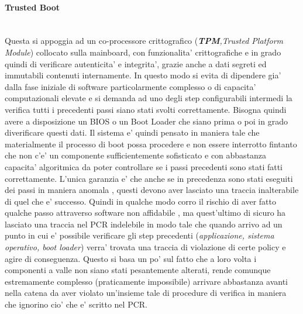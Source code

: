 \paragraph{Trusted Boot}\\
Questa si appoggia ad un co-processore crittografico (\emph{\textbf{TPM},Trusted Platform Module}) collocato sulla mainboard, con funzionalita' crittografiche e in grado quindi di verificare autenticita' e integrita', grazie anche a dati segreti ed immutabili contenuti internamente. In questo modo si evita di dipendere gia' dalla fase iniziale di software particolarmente complesso o di capacita' computazionali elevate e si demanda ad uno degli step configurabili intermedi la verifica tutti i precedenti passi siano stati svolti correttamente. Bisogna quindi avere a disposizione un BIOS o un Boot Loader che siano prima o poi in grado diverificare questi dati. Il sistema e' quindi pensato in maniera tale che materialmente il processo di boot possa procedere e non essere interrotto fintanto che non c'e' un componente sufficientemente sofisticato e con abbastanza capacita' algoritmica da poter controllare se i passi precedenti sono stati fatti correttamente. L'unica garanzia e' che anche se in precedenza sono stati eseguiti dei passi in maniera anomala , questi devono aver lasciato una traccia inalterabile di quel che e' successo. Quindi in qualche modo corro il rischio di aver fatto qualche passo attraverso software non affidabile , ma quest'ultimo di sicuro ha lasciato una traccia nel PCR indelebile in modo tale che quando arrivo ad un punto in cui e' possibile verificare gli step precedenti (\emph{applicazione, sistema operativo, boot loader}) verra' trovata una traccia di violazione di certe policy e agire di conseguenza. Questo si basa un po' sul fatto che a loro volta i componenti a valle non siano stati pesantemente alterati, rende comunque estremamente complesso (praticamente impossibile) arrivare abbastanza avanti nella catena da aver violato un'insieme tale di procedure di verifica in maniera che ignorino cio' che e' scritto nel PCR.


